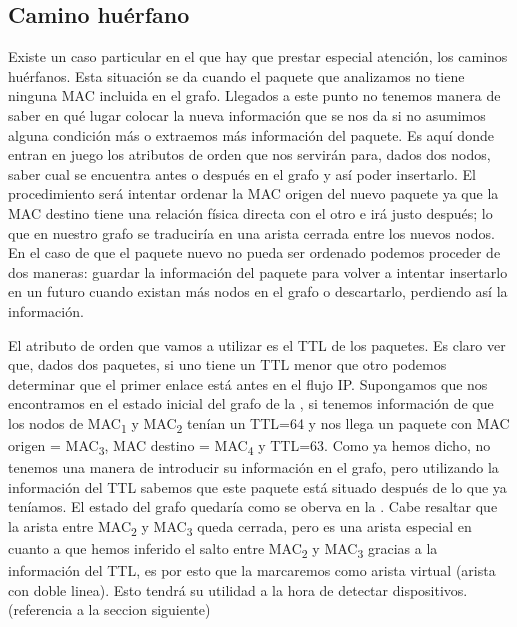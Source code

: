 \documentclass[twoside, 12pt]{epstfg}
\begin{document}
%

\subsection{Camino huérfano}
\label{subsec:Analisis:Reconstruccion:Huerfano}

Existe un caso particular en el que hay que prestar especial atención, los caminos huérfanos. Esta situación se da cuando el paquete que analizamos no tiene ninguna MAC incluida en el grafo. Llegados a este punto no tenemos manera de saber en qué lugar colocar la nueva información que se nos da si no asumimos alguna condición más o extraemos más información del paquete. Es aquí donde entran en juego los atributos de orden que nos servirán para, dados dos nodos, saber cual se encuentra antes o después en el grafo y así poder insertarlo. El procedimiento será intentar ordenar la MAC origen del nuevo paquete ya que la MAC destino tiene una relación física directa con el otro e irá justo después; lo que en nuestro grafo se traduciría en una arista cerrada entre los nuevos nodos. En el caso de que el paquete nuevo no pueda ser ordenado podemos proceder de dos maneras: guardar la información del paquete para volver a intentar insertarlo en un futuro cuando existan más nodos en el grafo o descartarlo, perdiendo así la información.

El atributo de orden que vamos a utilizar es el TTL de los paquetes. Es claro ver que, dados dos paquetes, si uno tiene un TTL menor que otro podemos determinar que el primer enlace está antes en el flujo IP. Supongamos que nos encontramos en el estado inicial del grafo de la , si tenemos información de que los nodos de MAC\textsubscript{1} y MAC\textsubscript{2} tenían un TTL=64 y nos llega un paquete con MAC origen = MAC\textsubscript{3}, MAC destino = MAC\textsubscript{4} y TTL=63. Como ya hemos dicho, no tenemos una manera de introducir su información en el grafo, pero utilizando la información del TTL sabemos que este paquete está situado después de lo que ya teníamos. El estado del grafo quedaría como se oberva en la . Cabe resaltar que la  arista entre MAC\textsubscript{2} y MAC\textsubscript{3} queda cerrada, pero es una arista especial en cuanto a que hemos inferido el salto entre MAC\textsubscript{2} y MAC\textsubscript{3} gracias a la información del TTL, es por esto que la marcaremos como arista virtual (arista con doble linea). Esto tendrá su utilidad a la hora de detectar dispositivos. (referencia a la seccion siguiente)
\end{document}
